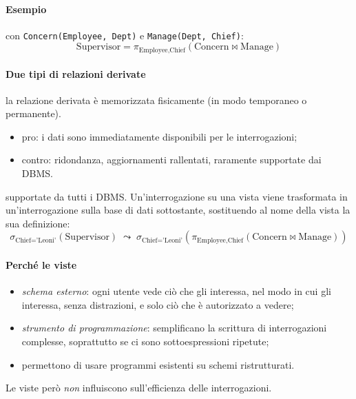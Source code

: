 \documentclass[a4paper,12pt]{article}
\begin{document}
\paragraph{Esempio} con \texttt{Concern(Employee, Dept)} e
\texttt{Manage(Dept, Chief)}:
\[
  \text{Supervisor} = \pi_{\text{Employee},\text{Chief}}
    (\text{Concern} \bowtie \text{Manage})
\]

\paragraph{Due tipi di relazioni derivate}
\begin{description}[style=nextline]
  \item[Viste materializzate] la relazione derivata è memorizzata fisicamente
    (in modo temporaneo o permanente).
    \begin{itemize}
      \item pro: i dati sono immediatamente disponibili per le interrogazioni;
      \item contro: ridondanza, aggiornamenti rallentati, raramente supportate
        dai DBMS.
    \end{itemize}
  \item[Relazioni virtuali (o viste)] supportate da tutti i DBMS.
    Un'interrogazione su una vista viene trasformata in un'interrogazione sulla
    base di dati sottostante, sostituendo al nome della vista la sua
    definizione:
    \[ \sigma_{\text{Chief} = \text{'Leoni'}}(\text{Supervisor})
       \;\leadsto\;
       \sigma_{\text{Chief} = \text{'Leoni'}}(\pi_{\text{Employee},\text{Chief}}
       (\text{Concern} \bowtie \text{Manage})) \]
\end{description}

\paragraph{Perché le viste}
\begin{itemize}
  \item \emph{schema esterno}: ogni utente vede ciò che gli interessa, nel modo
    in cui gli interessa, senza distrazioni, e solo ciò che è autorizzato a
    vedere;
  \item \emph{strumento di programmazione}: semplificano la scrittura di
    interrogazioni complesse, soprattutto se ci sono sottoespressioni ripetute;
  \item permettono di usare programmi esistenti su schemi ristrutturati.
\end{itemize}
Le viste però \emph{non} influiscono sull'efficienza delle interrogazioni.
\end{document}
